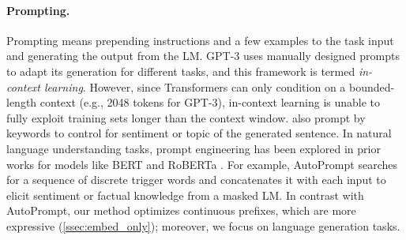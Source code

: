 \documentclass[11pt,a4paper]{article}
\begin{document}
\paragraph{Prompting.} 

Prompting means prepending instructions and a few examples to the task input and generating the output from the LM. GPT-3 \cite{brown2020language} uses manually designed prompts to adapt its generation for different tasks, and this framework is termed \emph{in-context learning}. However, since Transformers can only condition on a bounded-length context (e.g., 2048 tokens for GPT-3), in-context learning is unable to fully exploit training sets longer than the context window. 
\citet{sun2020conditioned} also prompt by keywords to control for sentiment or topic of the generated sentence. 
In natural language understanding tasks, prompt engineering has been explored in prior works for models like BERT and RoBERTa \citep{liu-etal-roberta, jiang-etal-2020-know, schick2020exploiting}. For example, AutoPrompt \cite{shin2020autoprompt} searches for a sequence of discrete trigger words and concatenates it with each input to elicit sentiment or factual knowledge from a masked LM. 
In contrast with AutoPrompt, our method optimizes continuous prefixes, which are more expressive (\cref{ssec:embed_only}); moreover, we focus on language generation tasks. 

\end{document}
